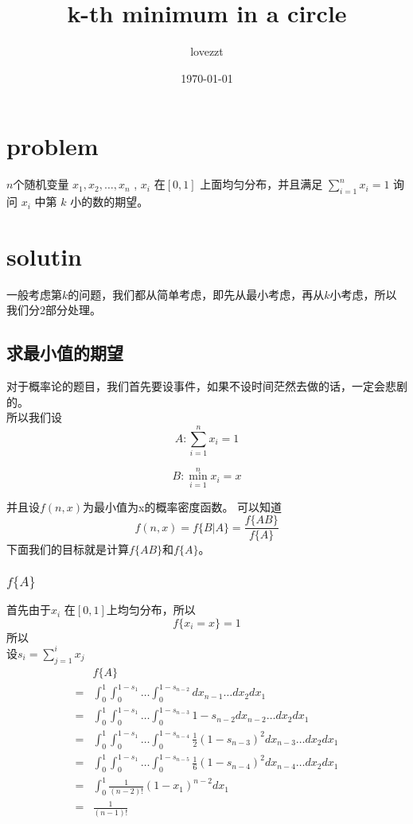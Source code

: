 \documentclass[11pt,a4paper]{article}
\begin{document}
\title{k-th minimum in a circle}
\author{lovezzt}
\date{\today}
\maketitle

\section{problem}
$n$个随机变量 $x_1, x_2, \dots, x_n$ , $x_i$ 在$\left[0,1\right]$ 上面均匀分布，并且满足 $\sum_{i=1}^{n} x_i = 1$ 询问 $x_i$
中第 $k$ 小的数的期望。

\section{solutin}
一般考虑第$k$的问题，我们都从简单考虑，即先从最小考虑，再从$k$小考虑，所以我们分$2$部分处理。

\subsection{求最小值的期望}
对于概率论的题目，我们首先要设事件，如果不设时间茫然去做的话，一定会悲剧的。\\
所以我们设 
\[
	A: \sum_{i=1}^{n} x_i = 1
\]	

\[
	B: \min_{i=1}^{n} x_i = x
\]	

并且设$f(n,x)$为最小值为x的概率密度函数。
可以知道
\[
	f(n,x)=f\lbrace B|A \rbrace=\frac{f\lbrace AB \rbrace}{f \lbrace A \rbrace}
\]
下面我们的目标就是计算$f\lbrace AB \rbrace$和$f \lbrace A \rbrace$。
\subsubsection{$f\lbrace A \rbrace$}
首先由于$x_i$ 在$\left[0,1\right]$上均匀分布，所以
\[
	f\lbrace x_i=x \rbrace = 1
\]
所以\\
设$s_i=\sum_{j=1}^{i} x_j$ \\
$$
\begin{array}{rl}
		& f\lbrace A \rbrace  \\
	=	& \int_{0}^{1} \int_{0}^{1-s_1} \dots \int_{0}^{1-s_{n-2}} dx_{n-1} \dots dx_2 dx_1 \\
	= 	& \int_{0}^{1} \int_{0}^{1-s_1} \dots \int_{0}^{1-s_{n-3}} 1-s_{n-2} dx_{n-2} \dots dx_2 dx_1 \\
	=  	& \int_{0}^{1} \int_{0}^{1-s_1} \dots \int_{0}^{1-s_{n-4}} \frac{1}{2} (1-s_{n-3})^{2} dx_{n-3} \dots dx_2 dx_1 \\
	=	& \int_{0}^{1} \int_{0}^{1-s_1} \dots \int_{0}^{1-s_{n-5}} \frac{1}{6} (1-s_{n-4})^{2} dx_{n-4} \dots dx_2 dx_1 \\
	=	& \int_{0}^{1} \frac{1}{(n-2)!} (1-x_1)^{n-2} dx_1 \\ 
	=	& \frac{1}{(n-1)!}
\end{array}
$$
\end{document}
